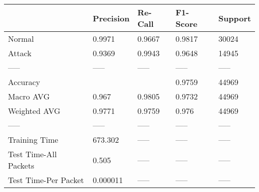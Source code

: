 \begin{tabular}{lllll}
\toprule
{} & Precision & Re-Call & F1-Score & Support \\
\midrule
Normal                &    0.9971 &  0.9667 &   0.9817 &   30024 \\
Attack                &    0.9369 &  0.9943 &   0.9648 &   14945 \\
-----                 &     ----- &   ----- &    ----- &   ----- \\
Accuracy              &           &         &   0.9759 &   44969 \\
Macro AVG             &     0.967 &  0.9805 &   0.9732 &   44969 \\
Weighted AVG          &    0.9771 &  0.9759 &    0.976 &   44969 \\
-----                 &     ----- &   ----- &    ----- &   ----- \\
Training Time         &   673.302 &   ----- &    ----- &   ----- \\
Test Time-All Packets &     0.505 &   ----- &    ----- &   ----- \\
Test Time-Per Packet  &  0.000011 &   ----- &    ----- &   ----- \\
\bottomrule
\end{tabular}

